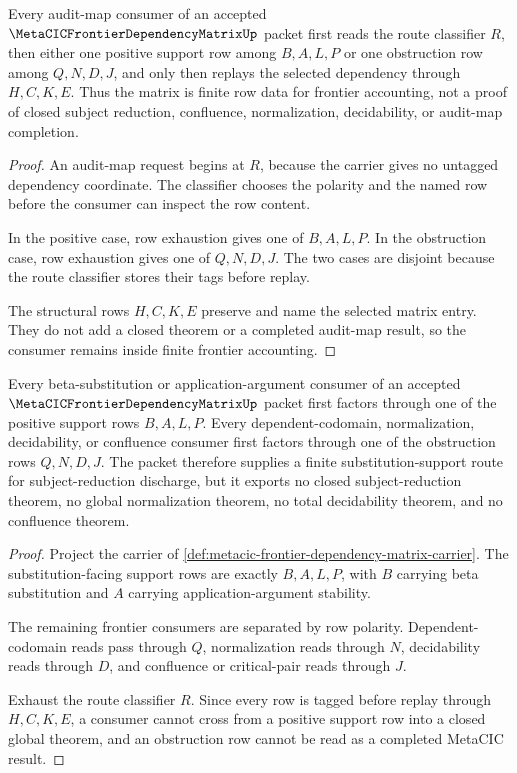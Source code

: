 \begin{theorem}
\label{thm:metacic-frontier-dependency-matrix-audit-route}
Every audit-map consumer of an accepted $\MetaCICFrontierDependencyMatrixUp$ packet first reads the route classifier $R$, then either one positive support row among $B,A,L,P$ or one obstruction row among $Q,N,D,J$, and only then replays the selected dependency through $H,C,K,E$. Thus the matrix is finite row data for frontier accounting, not a proof of closed subject reduction, confluence, normalization, decidability, or audit-map completion.
\end{theorem}
\begin{proof}
An audit-map request begins at $R$, because the carrier gives no untagged dependency coordinate. The classifier chooses the polarity and the named row before the consumer can inspect the row content.

In the positive case, row exhaustion gives one of $B,A,L,P$. In the obstruction case, row exhaustion gives one of $Q,N,D,J$. The two cases are disjoint because the route classifier stores their tags before replay.

The structural rows $H,C,K,E$ preserve and name the selected matrix entry. They do not add a closed theorem or a completed audit-map result, so the consumer remains inside finite frontier accounting.
\end{proof}

\begin{theorem}
\label{thm:metacic-frontier-dependency-matrix-substitution-support}
Every beta-substitution or application-argument consumer of an accepted $\MetaCICFrontierDependencyMatrixUp$ packet first factors through one of the positive support rows $B,A,L,P$. Every dependent-codomain, normalization, decidability, or confluence consumer first factors through one of the obstruction rows $Q,N,D,J$. The packet therefore supplies a finite substitution-support route for subject-reduction discharge, but it exports no closed subject-reduction theorem, no global normalization theorem, no total decidability theorem, and no confluence theorem.
\end{theorem}
\begin{proof}
Project the carrier of \autoref{def:metacic-frontier-dependency-matrix-carrier}. The substitution-facing support rows are exactly $B,A,L,P$, with $B$ carrying beta substitution and $A$ carrying application-argument stability.

The remaining frontier consumers are separated by row polarity. Dependent-codomain reads pass through $Q$, normalization reads through $N$, decidability reads through $D$, and confluence or critical-pair reads through $J$.

Exhaust the route classifier $R$. Since every row is tagged before replay through $H,C,K,E$, a consumer cannot cross from a positive support row into a closed global theorem, and an obstruction row cannot be read as a completed MetaCIC result.
\end{proof}

